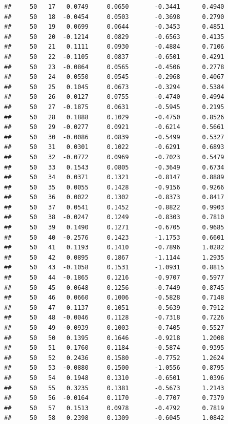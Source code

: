 \documentclass[
]{article}
\begin{document}
\begin{verbatim}
##     50   17   0.0749     0.0650       -0.3441      0.4940 
##     50   18  -0.0454     0.0503       -0.3698      0.2790 
##     50   19   0.0699     0.0644       -0.3453      0.4851 
##     50   20  -0.1214     0.0829       -0.6563      0.4135 
##     50   21   0.1111     0.0930       -0.4884      0.7106 
##     50   22  -0.1105     0.0837       -0.6501      0.4291 
##     50   23  -0.0864     0.0565       -0.4506      0.2778 
##     50   24   0.0550     0.0545       -0.2968      0.4067 
##     50   25   0.1045     0.0673       -0.3294      0.5384 
##     50   26   0.0127     0.0755       -0.4740      0.4994 
##     50   27  -0.1875     0.0631       -0.5945      0.2195 
##     50   28   0.1888     0.1029       -0.4750      0.8526 
##     50   29  -0.0277     0.0921       -0.6214      0.5661 
##     50   30  -0.0086     0.0839       -0.5499      0.5327 
##     50   31   0.0301     0.1022       -0.6291      0.6893 
##     50   32  -0.0772     0.0969       -0.7023      0.5479 
##     50   33   0.1543     0.0805       -0.3649      0.6734 
##     50   34   0.0371     0.1321       -0.8147      0.8889 
##     50   35   0.0055     0.1428       -0.9156      0.9266 
##     50   36   0.0022     0.1302       -0.8373      0.8417 
##     50   37   0.0541     0.1452       -0.8822      0.9903 
##     50   38  -0.0247     0.1249       -0.8303      0.7810 
##     50   39   0.1490     0.1271       -0.6705      0.9685 
##     50   40  -0.2576     0.1423       -1.1753      0.6601 
##     50   41   0.1193     0.1410       -0.7896      1.0282 
##     50   42   0.0895     0.1867       -1.1144      1.2935 
##     50   43  -0.1058     0.1531       -1.0931      0.8815 
##     50   44  -0.1865     0.1216       -0.9707      0.5977 
##     50   45   0.0648     0.1256       -0.7449      0.8745 
##     50   46   0.0660     0.1006       -0.5828      0.7148 
##     50   47   0.1137     0.1051       -0.5639      0.7912 
##     50   48  -0.0046     0.1128       -0.7318      0.7226 
##     50   49  -0.0939     0.1003       -0.7405      0.5527 
##     50   50   0.1395     0.1646       -0.9218      1.2008 
##     50   51   0.1760     0.1184       -0.5874      0.9395 
##     50   52   0.2436     0.1580       -0.7752      1.2624 
##     50   53  -0.0880     0.1500       -1.0556      0.8795 
##     50   54   0.1948     0.1310       -0.6501      1.0396 
##     50   55   0.3235     0.1381       -0.5673      1.2143 
##     50   56  -0.0164     0.1170       -0.7707      0.7379 
##     50   57   0.1513     0.0978       -0.4792      0.7819 
##     50   58   0.2398     0.1309       -0.6045      1.0842 

\end{verbatim}
\end{document}

